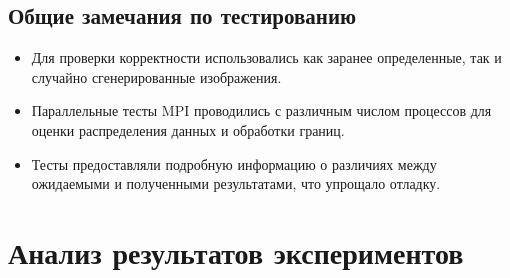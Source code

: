 \documentclass[12pt]{article}
\begin{document}
\subsection{Общие замечания по тестированию}

\begin{itemize}
    \item Для проверки корректности использовались как заранее определенные, так и случайно сгенерированные изображения.
    \item Параллельные тесты MPI проводились с различным числом процессов для оценки распределения данных и обработки границ.
    \item Тесты предоставляли подробную информацию о различиях между ожидаемыми и полученными результатами, что упрощало отладку.
\end{itemize}


\section{Анализ результатов экспериментов}
\end{document}
